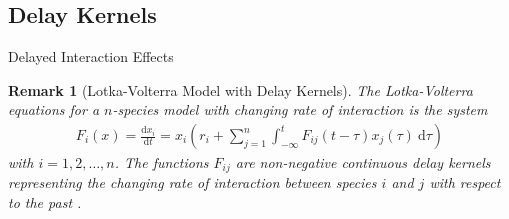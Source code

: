 \documentclass[10pt, dvipsnames]{beamer}
\newtheorem*{remark}{Remark}
\begin{document}
\subsection{Delay Kernels}
\begin{frame}{Delayed Interaction Effects}

\begin{remark}[Lotka-Volterra Model with Delay Kernels]
        The Lotka-Volterra equations for a $n$-species model with changing rate of interaction is the system
    \begin{align}\label{eq:lotka_volterra_with_delay}
        F_i(x) = \frac{\mathrm{d}x_i}{\mathrm{d}t} = x_i \left(r_i + \sum_{j = 1}^{n} \int_{-\infty}^{t}F_{ij}(t - \tau)x_j(\tau) \ \mathrm{d}\tau \right)
    \end{align}
    with $i = 1, 2, \ldots, n$. The functions $F_{ij}$ are non-negative continuous delay kernels representing the changing rate of interaction between species $i$ and $j$ with respect to the past \cite[8]{predatorpreymodel}.
\end{remark}
    
\end{frame}

\appendix
\begin{frame}[allowframebreaks]
\nocite{*}
\printbibliography
\end{frame}
\end{document}
